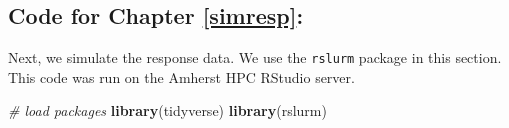 \documentclass[12pt, twoside]{amherstthesis}
\newenvironment{Shaded}{\begin{snugshade}}{\end{snugshade}}
\newcommand{\CommentTok}[1]{\textcolor[rgb]{0.56,0.35,0.01}{\textit{#1}}}
\newcommand{\FunctionTok}[1]{\textcolor[rgb]{0.13,0.29,0.53}{\textbf{#1}}}
\newcommand{\NormalTok}[1]{#1}
\begin{document}
\hypertarget{code-for-chapter-refsimresp}{%
\subsection{Code for Chapter \ref{simresp}:}\label{code-for-chapter-refsimresp}}

Next, we simulate the response data. We use the \texttt{rslurm} package in this section. This code was run on the Amherst HPC RStudio server.

\scriptsize
\begin{Shaded}
\begin{Highlighting}[]
\CommentTok{\# load packages}
\FunctionTok{library}\NormalTok{(tidyverse)}
\FunctionTok{library}\NormalTok{(rslurm)}
\end{Highlighting}
\end{Shaded}
\normalsize
\end{document}
